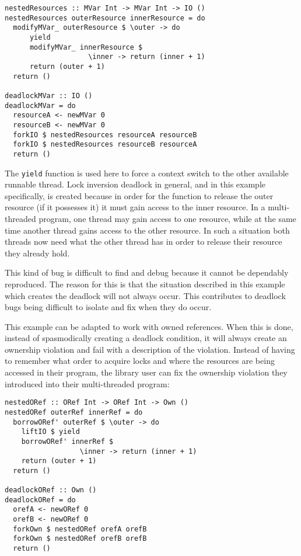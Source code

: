 \documentclass[onehalf,11pt]{beavtex}
\begin{document}
\begin{lstlisting}
nestedResources :: MVar Int -> MVar Int -> IO ()
nestedResources outerResource innerResource = do
  modifyMVar_ outerResource $ \outer -> do
      yield
      modifyMVar_ innerResource $
                    \inner -> return (inner + 1)
      return (outer + 1)
  return ()

deadlockMVar :: IO ()
deadlockMVar = do
  resourceA <- newMVar 0
  resourceB <- newMVar 0
  forkIO $ nestedResources resourceA resourceB
  forkIO $ nestedResources resourceB resourceA
  return ()
\end{lstlisting}

The \texttt{yield} function is used here to force a context switch to the other
available runnable thread.
Lock inversion deadlock in general, and in this example
specifically, is created because in order for the function to release the outer
resource (if it possesses it) it must gain access to the inner resource.
In a multi-threaded program, one thread may gain access to one resource,
while at the same time another thread gains access to the other resource.
In such a situation both threads now need what the other thread has in order to
release their resource they already hold.

This kind of bug is difficult to find and debug because it cannot be dependably
reproduced.  The reason for this is that the situation described in this
example which creates the deadlock will not always occur.
This contributes to deadlock bugs being difficult to isolate and fix when they
do occur.

This example can be adapted to work with owned references.
When this is done, instead of spasmodically creating a deadlock condition,
it will always create an ownership violation and fail with a description of the
violation.
Instead of having to remember what order to acquire locks and where the
resources are being accessed in their program, the library user can fix the
ownership violation they introduced into their multi-threaded program:

\begin{lstlisting}
nestedORef :: ORef Int -> ORef Int -> Own ()
nestedORef outerRef innerRef = do
  borrowORef' outerRef $ \outer -> do
    liftIO $ yield
    borrowORef' innerRef $ 
                  \inner -> return (inner + 1)
    return (outer + 1)
  return ()

deadlockORef :: Own ()
deadlockORef = do
  orefA <- newORef 0
  orefB <- newORef 0
  forkOwn $ nestedORef orefA orefB
  forkOwn $ nestedORef orefB orefB
  return ()
\end{lstlisting}
\end{document}
